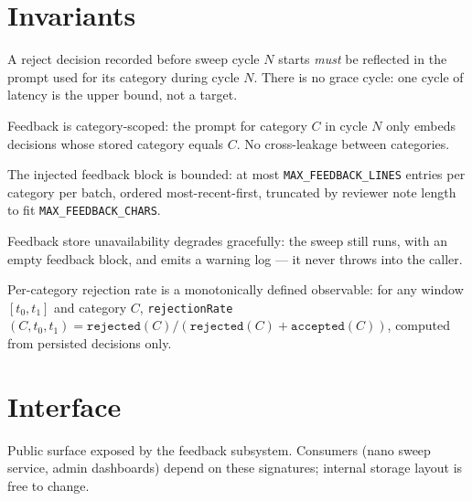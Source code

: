 \section{Invariants}
\begin{invariant}
A reject decision recorded before sweep cycle $N$ starts \emph{must} be reflected in the prompt
used for its category during cycle $N$. There is no grace cycle: one cycle of latency is the
upper bound, not a target.
\end{invariant}

\begin{invariant}
Feedback is category-scoped: the prompt for category $C$ in cycle $N$ only embeds decisions
whose stored category equals $C$. No cross-leakage between categories.
\end{invariant}

\begin{invariant}
The injected feedback block is bounded: at most \texttt{MAX\_FEEDBACK\_LINES} entries per category
per batch, ordered most-recent-first, truncated by reviewer note length to fit \texttt{MAX\_FEEDBACK\_CHARS}.
\end{invariant}

\begin{invariant}
Feedback store unavailability degrades gracefully: the sweep still runs, with an empty feedback
block, and emits a warning log --- it never throws into the caller.
\end{invariant}

\begin{invariant}
Per-category rejection rate is a monotonically defined observable: for any window $[t_0, t_1]$ and
category $C$, \texttt{rejectionRate}$(C, t_0, t_1) = \texttt{rejected}(C) / (\texttt{rejected}(C) + \texttt{accepted}(C))$,
computed from persisted decisions only.
\end{invariant}

\section{Interface}
Public surface exposed by the feedback subsystem. Consumers (nano sweep service, admin
dashboards) depend on these signatures; internal storage layout is free to change.

